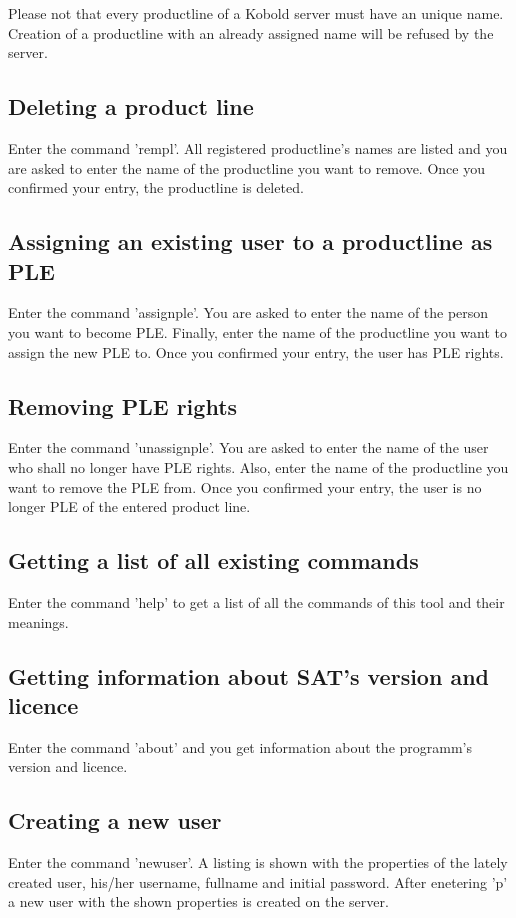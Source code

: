 Please not that every productline of a Kobold server must have an unique name. Creation
of a productline with an already assigned name will be refused by the server.

\subsection{Deleting a product line}
Enter the command 'rempl'. All registered productline's names are listed and you are 
asked to enter the name of the productline you want to remove. Once you confirmed your 
entry, the productline is deleted.

\subsection{Assigning an existing user to a productline as PLE}
Enter the command 'assignple'. You are asked to enter the name of the person you want
to become PLE. Finally, enter the name of the productline you want to assign the new 
PLE to. Once you confirmed your entry, the user has PLE rights.

\subsection{Removing PLE rights}
Enter the command 'unassignple'. You are asked to enter the name of the user who shall 
no longer have PLE rights. Also, enter the name of the productline you want to
remove the PLE from. Once you confirmed your entry, the user is no longer PLE of
the entered product line.

\subsection{Getting a list of all existing commands}
Enter the command 'help' to get a list of all the commands of this tool and
their meanings.

\subsection{Getting information about SAT's version and licence}
Enter the command 'about' and you get information about the programm's version and licence.

\subsection{Creating a new user}
Enter the command 'newuser'. A listing is shown with the properties of the lately created
user, his/her username, fullname and initial password. After enetering 'p' a new user with
the shown properties is created on the server.\par


